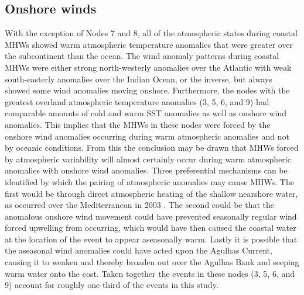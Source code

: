 \documentclass[utf8]{frontiersSCNS}
\begin{document}
\subsection{Onshore winds}
With the exception of Nodes 7 and 8, all of the atmospheric states during coastal MHWs showed warm atmospheric temperature anomalies that were greater over the subcontinent than the ocean. The wind anomaly patterns during coastal MHWs were either strong north-westerly anomalies over the Atlantic with weak south-easterly anomalies over the Indian Ocean, or the inverse, but always showed some wind anomalies moving onshore. Furthermore, the nodes with the greatest overland atmospheric temperature anomalies (3, 5, 6, and 9) had comparable amounts of cold and warm SST anomalies as well as onshore wind anomalies. This implies that the MHWs in these nodes were forced by the onshore wind anomalies occurring during warm atmospheric anomalies and not by oceanic conditions. From this the conclusion may be drawn that MHWs forced by atmospheric variability will almost certainly occur during warm atmospheric anomalies with onshore wind anomalies. Three preferential mechanisms can be identified by which the pairing of atmospheric anomalies may cause MHWs. The first would be through direct atmospheric heating of the shallow nearshore water, as occurred over the Mediterranean in 2003 \citep{Garrabou2009}. The second could be that the anomalous onshore wind movement could have prevented seasonally regular wind forced upwelling from occurring, which would have then caused the coastal water at the location of the event to appear aseasonally warm. Lastly it is possible that the aseasonal wind anomalies could have acted upon the Agulhas Current, causing it to weaken and thereby broaden out over the Agulhas Bank and seeping warm water onto the cost. Taken together the events in these nodes (3, 5, 6, and 9) account for roughly one third of the events in this study.
\end{document}
